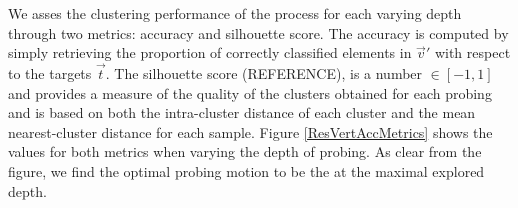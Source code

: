 \documentclass[]{interact}
\theoremstyle{plain}%
\theoremstyle{definition}
\theoremstyle{remark}
\begin{document}
We asses the clustering performance of the process for each varying depth through two metrics: accuracy and silhouette score. The accuracy is computed by simply retrieving the proportion of correctly classified elements in $\vec{v}'$ with respect to the targets $\vec{t}$. The silhouette score (REFERENCE), is a number $\in [-1,1]$ and provides a measure of the quality of the clusters obtained for each probing and is based on both the intra-cluster distance of each cluster and the mean nearest-cluster distance for each sample. Figure \ref{ResVertAccMetrics} shows the values for both metrics when varying the depth of probing. As clear from the figure, we find the optimal probing motion to be the at the maximal explored depth.

\end{document}
